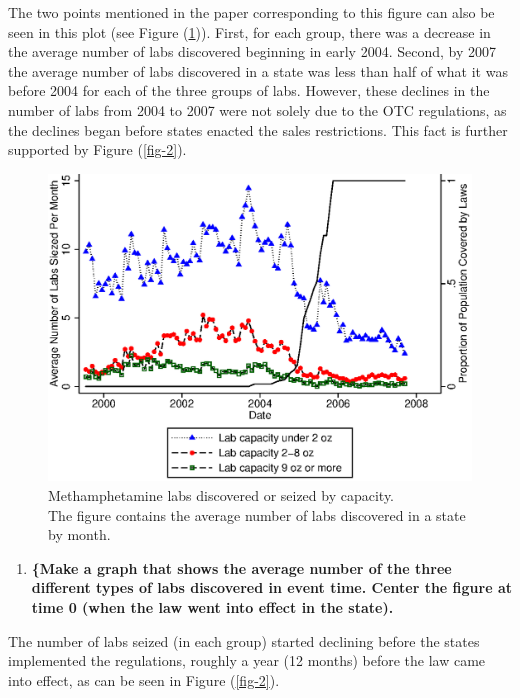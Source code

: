 \documentclass[
  11pt,
]{article}
\providecommand{\tightlist}{%
  \setlength{\itemsep}{0pt}\setlength{\parskip}{0pt}}
\begin{document}
The two points mentioned in the paper corresponding to this figure can
also be seen in this plot (see Figure (\ref{fig-1})). First, for each
group, there was a decrease in the average number of labs discovered
beginning in early 2004. Second, by 2007 the average number of labs
discovered in a state was less than half of what it was before 2004 for
each of the three groups of labs. However, these declines in the number
of labs from 2004 to 2007 were not solely due to the OTC regulations, as
the declines began before states enacted the sales restrictions. This
fact is further supported by Figure (\ref{fig-2}).

\begin{figure}[H]
 \centering
 \includegraphics{number_of_labs_siezed-timeseries.eps}
 \caption{Methamphetamine labs discovered or seized by capacity. \\ The
figure contains the average number of labs discovered in a state by
month.}
\label{fig-1}
\end{figure}

\begin{enumerate}
\def\labelenumi{(\alph{enumi})}
\setcounter{enumi}{1}
\tightlist
\item
  \textbf{\{Make a graph that shows the average number of the three
  different types of labs discovered in event time. Center the figure at
  time 0 (when the law went into effect in the state).}
\end{enumerate}

The number of labs seized (in each group) started declining before the
states implemented the regulations, roughly a year (12 months) before
the law came into effect, as can be seen in Figure (\ref{fig-2}).
\end{document}
